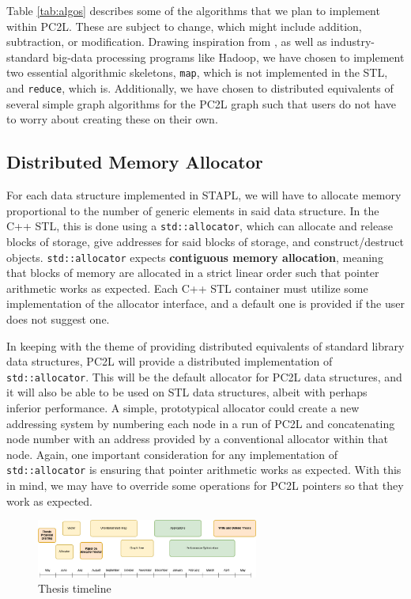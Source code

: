 Table \ref{tab:algos} describes some of the algorithms that we plan to implement within PC2L. These are subject to change, which might include addition, subtraction, or modification. Drawing inspiration from \cite{STAPL}, as well as industry-standard big-data processing programs like Hadoop, we have chosen to implement two essential algorithmic skeletons, \texttt{map}, which is not implemented in the STL, and \texttt{reduce}, which is. Additionally, we have chosen to distributed equivalents of several simple graph algorithms for the PC2L graph such that users do not have to worry about creating these on their own.  

\subsection{Distributed Memory Allocator}

For each data structure implemented in STAPL, we will have to allocate memory proportional to the number of generic elements in said data structure. In the C++ STL, this is done using a \texttt{std::allocator}, which can allocate and release blocks of storage, give addresses for said blocks of storage, and construct/destruct objects. \texttt{std::allocator} expects \textbf{contiguous memory allocation}, meaning that blocks of memory are allocated in a strict linear order such that pointer arithmetic works as expected. Each C++ STL container must utilize some implementation of the allocator interface, and a default one is provided if the user does not suggest one.

In keeping with the theme of providing distributed equivalents of standard library data structures, PC2L will provide a distributed implementation of \texttt{std::allocator}. This will be the default allocator for PC2L data structures, and it will also be able to be used on STL data structures, albeit with perhaps inferior performance. A simple, prototypical allocator could create a new addressing system by numbering each node in a run of PC2L and concatenating node number with an address provided by a conventional allocator within that node. Again, one important consideration for any implementation of \texttt{std::allocator} is ensuring that pointer arithmetic works as expected. With this in mind, we may have to override some operations for PC2L pointers so that they work as expected.  

\begin{figure}[h]
\centering
\includegraphics[width=0.65\textwidth]{Figures/thesis_timeline.jpg}
\caption{Thesis timeline}
\label{fig:thesis_timeline}
\end{figure}



